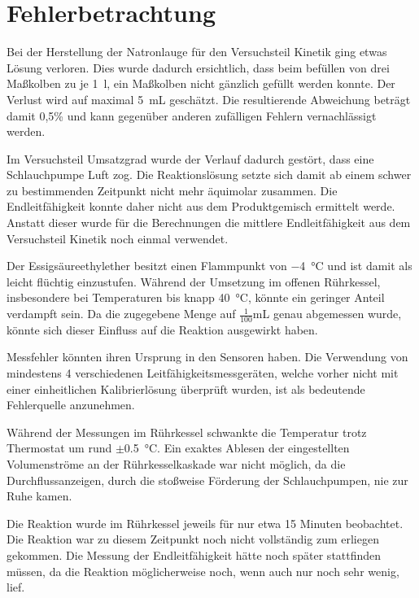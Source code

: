 \section{Fehlerbetrachtung}
\label{sec:fehler}

Bei der Herstellung der Natronlauge für den Versuchsteil Kinetik ging etwas Lösung verloren. Dies wurde dadurch ersichtlich, dass beim befüllen von drei Maßkolben zu je \SI{1}{\litre}, ein Maßkolben nicht gänzlich gefüllt werden konnte. Der Verlust wird auf maximal \SI{5}{\milli\liter} geschätzt. Die resultierende Abweichung beträgt damit 0,5\% und kann gegenüber anderen zufälligen Fehlern vernachlässigt werden. 

Im Versuchsteil Umsatzgrad wurde der Verlauf dadurch gestört, dass eine Schlauchpumpe Luft zog. Die Reaktionslösung setzte sich damit ab einem schwer zu bestimmenden Zeitpunkt nicht mehr äquimolar zusammen. Die Endleitfähigkeit konnte daher nicht aus dem Produktgemisch ermittelt werde. Anstatt dieser wurde für die Berechnungen die mittlere Endleitfähigkeit aus dem Versuchsteil Kinetik noch einmal verwendet. 

Der Essigsäureethylether besitzt einen Flammpunkt von \SI{-4}{\degreeCelsius} und ist damit als leicht flüchtig einzustufen. Während der Umsetzung im offenen Rührkessel, insbesondere bei Temperaturen bis knapp \SI{40}{\degreeCelsius}, könnte ein geringer Anteil verdampft sein. Da die zugegebene Menge auf $\frac{1}{100}$\si{\milli\liter} genau abgemessen wurde, könnte sich dieser Einfluss auf die Reaktion ausgewirkt haben.

Messfehler könnten ihren Ursprung in den Sensoren haben. Die Verwendung von mindestens 4 verschiedenen Leitfähigkeitsmessgeräten, welche vorher nicht mit einer einheitlichen Kalibrierlösung überprüft wurden, ist als bedeutende Fehlerquelle anzunehmen.  

Während der Messungen im Rührkessel schwankte die Temperatur trotz Thermostat um rund $\pm$\SI{0,5}{\degreeCelsius}. 
Ein exaktes Ablesen der eingestellten Volumenströme an der Rührkesselkaskade war nicht möglich, da die Durchflussanzeigen, durch die stoßweise Förderung der Schlauchpumpen, nie zur Ruhe kamen.

Die Reaktion wurde im Rührkessel jeweils für nur etwa 15 Minuten beobachtet. Die Reaktion war zu diesem Zeitpunkt noch nicht vollständig zum erliegen gekommen. Die Messung der Endleitfähigkeit hätte noch später stattfinden müssen, da die Reaktion möglicherweise noch, wenn auch nur noch sehr wenig, lief.
